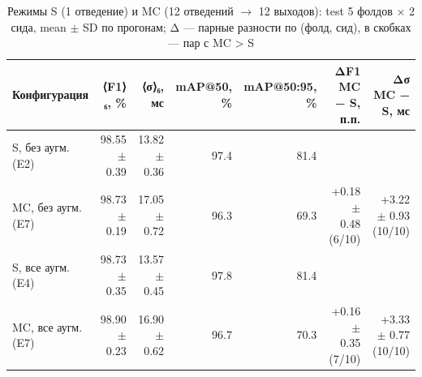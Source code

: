 \begin{table}[t]
\centering
\small
\caption{Режимы S (1 отведение) и MC (12 отведений $\to$ 12 выходов): test 5 фолдов × 2 сида, mean $\pm$ SD по прогонам; Δ — парные разности по (фолд, сид), в скобках — пар с MC > S}
\label{tab:modes}
\begin{tabular}{lrrrrrr}
\toprule
Конфигурация & ⟨F1⟩₆, \% & ⟨σ⟩₆, мс & mAP@50, \% & mAP@50:95, \% & ΔF1 MC − S, п.п. & Δσ MC − S, мс \\
\midrule
S, без аугм. (E2) & 98.55 $\pm$ 0.39 & 13.82 $\pm$ 0.36 & 97.4 & 81.4 &  &  \\
MC, без аугм. (E7) & 98.73 $\pm$ 0.19 & 17.05 $\pm$ 0.72 & 96.3 & 69.3 & +0.18 $\pm$ 0.48 (6/10) & +3.22 $\pm$ 0.93 (10/10) \\
S, все аугм. (E4) & 98.73 $\pm$ 0.35 & 13.57 $\pm$ 0.45 & 97.8 & 81.4 &  &  \\
MC, все аугм. (E7) & 98.90 $\pm$ 0.23 & 16.90 $\pm$ 0.62 & 96.7 & 70.3 & +0.16 $\pm$ 0.35 (7/10) & +3.33 $\pm$ 0.77 (10/10) \\
\bottomrule
\end{tabular}
\end{table}

